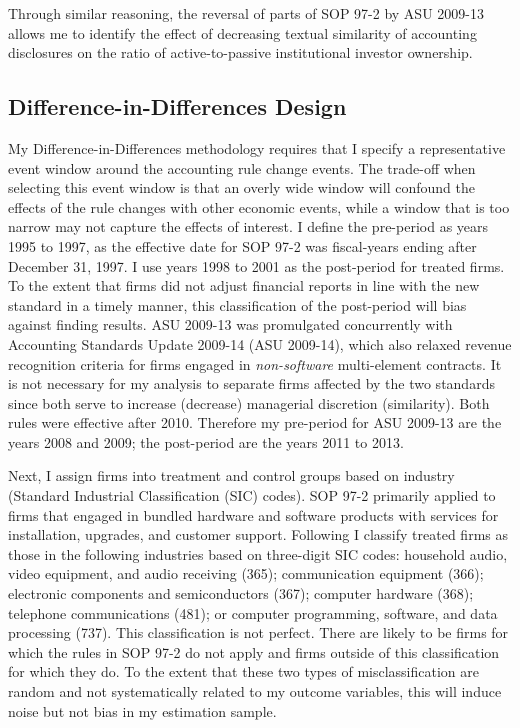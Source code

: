 \documentclass[thesis]{thesis-umich}
\begin{document}
Through similar reasoning, the reversal of parts of SOP 97-2 by ASU 2009-13 allows me to identify the effect of decreasing textual similarity of accounting disclosures on the ratio of active-to-passive institutional investor ownership.

\subsection{Difference-in-Differences Design}\label{ssec:dd}

My Difference-in-Differences methodology requires that I specify a representative event window around the accounting rule change events. The trade-off when selecting this event window is that an overly wide window will confound the effects of the rule changes with other economic events, while a window that is too narrow may not capture the effects of interest. I define the pre-period as years 1995 to 1997, as the effective date for SOP 97-2 was fiscal-years ending after December 31, 1997. I use years 1998 to 2001 as the post-period for treated firms. To the extent that firms did not adjust financial reports in line with the new standard in a timely manner, this classification of the post-period will bias against finding results. ASU 2009-13 was promulgated concurrently with Accounting Standards Update 2009-14 (ASU 2009-14), which also relaxed revenue recognition criteria for firms engaged in \emph{non-software} multi-element contracts. It is not necessary for my analysis to separate firms affected by the two standards since both serve to increase (decrease) managerial discretion (similarity). Both rules were effective after 2010. Therefore my pre-period for ASU 2009-13 are the years 2008 and 2009; the post-period are the years 2011 to 2013.

Next, I assign firms into treatment and control groups based on industry (Standard Industrial Classification (SIC) codes). SOP 97-2 primarily applied to firms that engaged in bundled hardware and software products with services for installation, upgrades, and customer support. Following \cite{srivastava2014} I classify treated firms as those in the following industries based on three-digit SIC codes: household audio, video equipment, and audio receiving (365); communication equipment (366); electronic components and semiconductors (367); computer hardware (368); telephone communications (481); or computer programming, software, and data processing (737). This classification is not perfect. There are likely to be firms for which the rules in SOP 97-2 do not apply and firms outside of this classification for which they do. To the extent that these two types of misclassification are random and not systematically related to my outcome variables, this will induce noise but not bias in my estimation sample. 
\end{document}
